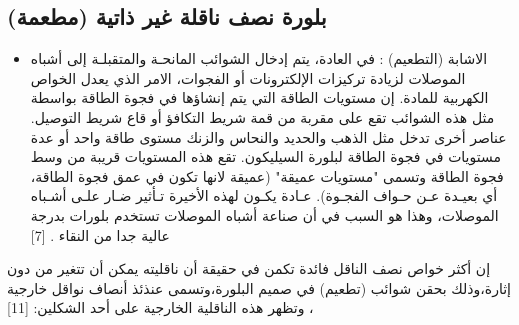 	\subsection{  بلورة نصف ناقلة غير ذاتية (مطعمة)} 
	\begin{itemize}
		\item الاشابة (التطعيم) : 
		في العادة، يتم إدخال الشوائب المانحـة والمتقبلـة إلى أشباه الموصلات لزيادة تركيزات الإلكترونات أو الفجوات، الامر الذي يعدل الخواص الكهربية للمادة. إن مستويات الطاقة التي يتم إنشاؤها في فجوة الطاقة بواسطة مثل هذه الشوائب تقع على مقربة من قمة شريط التكافؤ أو قاع شريط التوصيل. عناصر أخرى تدخل مثل الذهب والحديد والنحاس والزنك مستوى طاقة واحد أو عدة مستويات في فجوة الطاقة لبلورة السيليكون. تقع هذه المستويات قريبة من وسط فجوة الطاقة وتسمى "مستويات عميقة" (عميقة لانها تكون في عمق فجوة الطاقة، أي بعيـدة عـن حـواف الفجـوة). عـادة يكـون لهذه الأخيرة تـأثير ضـار علـى أشـباه الموصلات، وهذا هو السبب في أن صناعة أشباه الموصلات تستخدم بلورات بدرجة عالية جدا من النقاء . [7]
		
	\end{itemize}
	إن أكثر خواص نصف الناقل فائدة تكمن في حقيقة أن ناقليته يمكن أن تتغير من دون إثارة،وذلك بحقن شوائب (تطعيم) في صميم البلورة،وتسمى عنذئذ أنصاف نواقل خارجية ، وتظهر هذه الناقلية الخارجية على أحد الشكلين:
	[11]
